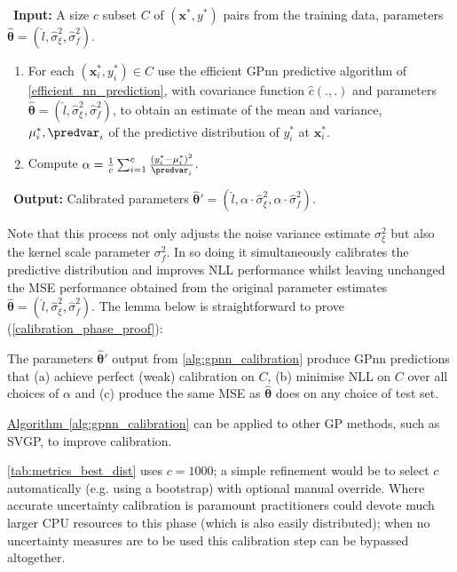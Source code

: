   \begin{algorithm}[h]
     \,\,\,\textbf{Input:} A size $c$ subset $C$ of $(\bm{x}^*,y^*)$ pairs from the training data, parameters $\hat{\bm{\theta}} = (\hat{l},\hat{\sigma}_\xi^2,\hat{\sigma}_f^2)$.
    \begin{enumerate}[itemsep=1pt]
      \item For each $(\bm{x}_i^*,y_i^*) \in C$ use the efficient GPnn predictive algorithm of \ref{efficient_nn_prediction}, with covariance function $\hat{c}(.,.)$ and parameters $\hat{\bm{\theta}} = (\hat{l},\hat{\sigma}_\xi^2,\hat{\sigma}_f^2)$, to obtain an estimate of the mean and variance, $\mu_i^*,\predvar_i$ of the predictive distribution of $y_i^*$ at $\bm{x}_i^*$.
      \item Compute $\alpha = \frac{1}{c}\sum_{i=1}^c \frac{(y_i^* - \mu_i^*)^2}{\predvar_i}$.
    \end{enumerate}    
    \,\,\,\textbf{Output:} Calibrated parameters $\hat{\bm{\theta}}' = (\hat{l},\alpha \cdot \hat{\sigma}_\xi^2, \alpha \cdot \hat{\sigma}_f^2)$.
     \caption{Calibration of Predictive Distribution}
     \label{alg:gpnn_calibration}
   \end{algorithm}
Note that this process not only adjusts the noise variance estimate $\sigma_\xi^2$ but also the kernel scale parameter $\sigma_f^2$. In so doing it simultaneously calibrates the predictive distribution and improves NLL performance whilst leaving unchanged the MSE performance obtained from the original parameter estimates $\hat{\bm{\theta}} = (\hat{l},\hat{\sigma}_\xi^2,\hat{\sigma}_f^2)$. The lemma below is straightforward to prove (\autoref{calibration_phase_proof}):
\begin{lemma}[Calibration]
\label{calibration_lemma}
The parameters $\hat{\bm{\theta}}'$ output from \autoref {alg:gpnn_calibration} produce GPnn predictions that (a) achieve perfect (weak) calibration on $C$, (b) minimise NLL on $C$ over all choices of $\alpha$ and (c) produce the same MSE as $\hat{\bm{\theta}}$ does on any choice of test set.
\end{lemma}
\begin{remark}
     \hyperref[alg:gpnn_calibration]{Algorithm~\ref*{alg:gpnn_calibration}} can be applied to other GP methods, such as SVGP, to improve calibration.
\end{remark}
\autoref{tab:metrics_best_dist} uses $c = 1000$; a simple refinement would be to select $c$ automatically (e.g. using a bootstrap) with optional manual override. Where accurate uncertainty calibration is paramount practitioners could devote much larger CPU resources to this phase (which is also easily distributed); when no uncertainty measures are to be used this calibration step can be bypassed altogether.


